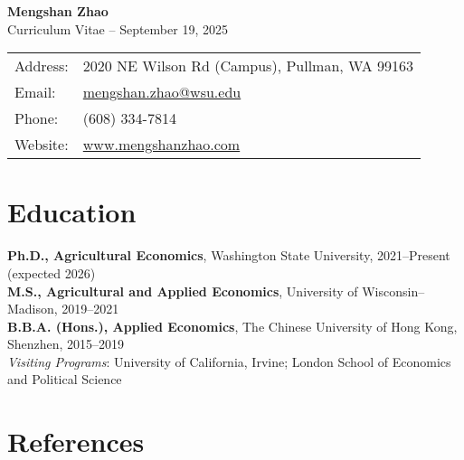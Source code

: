 \documentclass[11pt,letterpaper]{article}
\newcommand{\Name}{\textbf{\LARGE Mengshan Zhao}}
\newcommand{\Today}{September 19, 2025}
\begin{document}
{\centering
\Name\\[4pt]
Curriculum Vitae \hspace{0.5em}--\hspace{0.5em} \Today\\[8pt]
\par}

\begin{flushleft}
\begin{tabular}{@{}ll}
Address: & 2020 NE Wilson Rd (Campus), Pullman, WA 99163\\
Email: & \href{mailto:mengshan.zhao@wsu.edu}{mengshan.zhao@wsu.edu}\\
Phone: & (608) 334-7814\\
Website: & \href{https://www.mengshanzhao.com}{www.mengshanzhao.com}
\end{tabular}
\end{flushleft}

\section{Education}

\textbf{Ph.D., Agricultural Economics}, Washington State University, 2021–Present (expected 2026)\\
\textbf{M.S., Agricultural and Applied Economics}, University of Wisconsin–Madison, 2019–2021\\
\textbf{B.B.A. (Hons.), Applied Economics}, The Chinese University of Hong Kong, Shenzhen, 2015–2019\\
\textit{Visiting Programs}: University of California, Irvine; London School of Economics and Political Science

\section{References}
\end{document}
